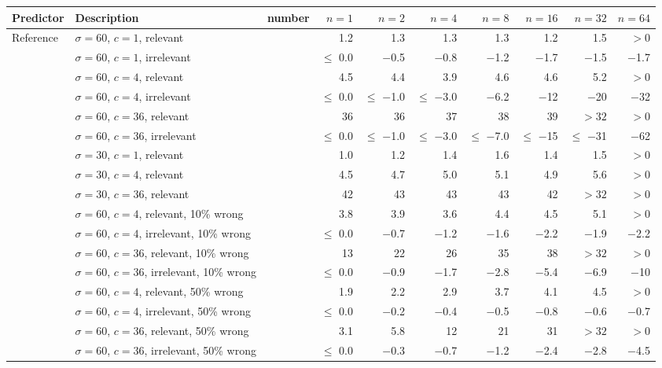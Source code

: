 \begin{tabular}{llrrrrrrrr}
\toprule
Predictor & Description & number & $n = 1$ & $n = 2$ & $n = 4$ & $n = 8$ & $n = 16$ & $n = 32$ & $n = 64$ \\
\midrule
Reference & $\sigma = 60$, $c = 1$, relevant &  & 1.2 & 1.3 & 1.3 & 1.3 & 1.2 & 1.5 & $> 0$ \\
 & $\sigma = 60$, $c = 1$, irrelevant &  & $\leq$ 0.0 & $-$0.5 & $-$0.8 & $-$1.2 & $-$1.7 & $-$1.5 & $-$1.7 \\
 & $\sigma = 60$, $c = 4$, relevant &  & 4.5 & 4.4 & 3.9 & 4.6 & 4.6 & 5.2 & $> 0$ \\
 & $\sigma = 60$, $c = 4$, irrelevant &  & $\leq$ 0.0 & $\leq$ $-$1.0 & $\leq$ $-$3.0 & $-$6.2 & $-$12 & $-$20 & $-$32 \\
 & $\sigma = 60$, $c = 36$, relevant &  & 36 & 36 & 37 & 38 & 39 & $> 32$ & $> 0$ \\
 & $\sigma = 60$, $c = 36$, irrelevant &  & $\leq$ 0.0 & $\leq$ $-$1.0 & $\leq$ $-$3.0 & $\leq$ $-$7.0 & $\leq$ $-$15 & $\leq$ $-$31 & $-$62 \\
 & $\sigma = 30$, $c = 1$, relevant &  & 1.0 & 1.2 & 1.4 & 1.6 & 1.4 & 1.5 & $> 0$ \\
 & $\sigma = 30$, $c = 4$, relevant &  & 4.5 & 4.7 & 5.0 & 5.1 & 4.9 & 5.6 & $> 0$ \\
 & $\sigma = 30$, $c = 36$, relevant &  & 42 & 43 & 43 & 43 & 42 & $> 32$ & $> 0$ \\
 & $\sigma = 60$, $c = 4$, relevant, 10\% wrong &  & 3.8 & 3.9 & 3.6 & 4.4 & 4.5 & 5.1 & $> 0$ \\
 & $\sigma = 60$, $c = 4$, irrelevant, 10\% wrong &  & $\leq$ 0.0 & $-$0.7 & $-$1.2 & $-$1.6 & $-$2.2 & $-$1.9 & $-$2.2 \\
 & $\sigma = 60$, $c = 36$, relevant, 10\% wrong &  & 13 & 22 & 26 & 35 & 38 & $> 32$ & $> 0$ \\
 & $\sigma = 60$, $c = 36$, irrelevant, 10\% wrong &  & $\leq$ 0.0 & $-$0.9 & $-$1.7 & $-$2.8 & $-$5.4 & $-$6.9 & $-$10 \\
 & $\sigma = 60$, $c = 4$, relevant, 50\% wrong &  & 1.9 & 2.2 & 2.9 & 3.7 & 4.1 & 4.5 & $> 0$ \\
 & $\sigma = 60$, $c = 4$, irrelevant, 50\% wrong &  & $\leq$ 0.0 & $-$0.2 & $-$0.4 & $-$0.5 & $-$0.8 & $-$0.6 & $-$0.7 \\
 & $\sigma = 60$, $c = 36$, relevant, 50\% wrong &  & 3.1 & 5.8 & 12 & 21 & 31 & $> 32$ & $> 0$ \\
 & $\sigma = 60$, $c = 36$, irrelevant, 50\% wrong &  & $\leq$ 0.0 & $-$0.3 & $-$0.7 & $-$1.2 & $-$2.4 & $-$2.8 & $-$4.5 \\

\end{tabular}
